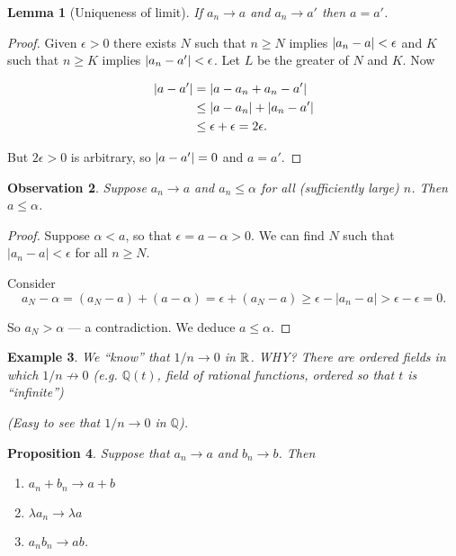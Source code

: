 \documentclass{notes}
\theoremstyle{plain}
\newtheorem{proposition}{Proposition}[chapter]
\newtheorem{observation}[proposition]{Observation}
\newtheorem{example}[proposition]{Example}
\newtheorem{lemma}[proposition]{Lemma}
\newcommand{\Q}{\mathbb{Q}}
\begin{document}
\begin{lemma}[Uniqueness of limit]
\label{lem:uniq-lim}
If $a_{n}\to a$ and $a_{n}\to a'$ then $a = a' $.
\end{lemma}

\begin{proof}
Given $\epsilon >0$ there exists $N$ such that
$n \ge N$ implies $\left|a_n - a\right| < \epsilon$ and $K$ such that $n \ge
K$ implies $\left|a_n - a'\right| < \epsilon$.  Let $L$ be the greater of $N$
and $K$.  Now

\begin{align*}
\left|a - a'\right| &= \left|a - a_n + a_n - a'\right| \\
&\le \left|a-a_n\right| + \left|a_n - a'\right| \\
& \le \epsilon + \epsilon = 2 \epsilon.
\end{align*}

But $2 \epsilon > 0$ is arbitrary, so $\left|a - a'\right|=0$ and $a = a'$.
\end{proof}

\begin{observation}
Suppose $a_{n} \to a$ and $a_{n} \leq \alpha$ for 
all (sufficiently large) $ n $. Then $a \leq \alpha$.
\end{observation}

\begin{proof}
Suppose $ \alpha < a $, so that $\epsilon = a - \alpha > 0$.
We can find $ N $ such that $|a_{n}-a|< \epsilon$ for all $ n 
\geq N $.

Consider
\[
a_{N}-\alpha = (a_{N}-a)+(a-\alpha) = \epsilon + 
(a_{N}-a)  \geq \epsilon - 
|a_{n}-a| > \epsilon - \epsilon = 0.
\]

So $a_{N}> \alpha$ --- a contradiction.  We deduce $ a \leq \alpha $.
\end{proof}

\begin{example}
We ``know'' that $ 1/n \to 0 $ in $ \mathbb{R} $. \emph{WHY?} 
There are ordered fields in which $ 1/n \not\to 0 $ (e.g. 
$ \Q(t) $, field of rational functions, ordered so that $ t $ is 
``infinite'')

(Easy to see that $ 1/n \to 0  $ in $ \Q $).
\end{example}

\begin{proposition}
\label{p1.1}
Suppose that $ a_{n} \to a $ and $ b_{n}\to b $. 
Then
\begin{enumerate}
\item $ a_{n}+b_{n} \to a+b $
\item $ \lambda a_{n} \to \lambda a$
\item $ a_{n}b_{n} \to ab $.
\end{enumerate}
\end{proposition}
\end{document}
